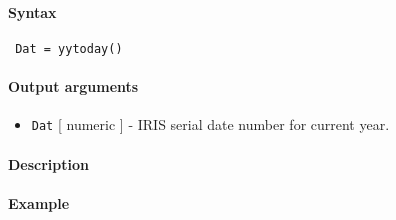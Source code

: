 


	\paragraph{Syntax}
 
 \begin{verbatim}
 Dat = yytoday()
 \end{verbatim}
 
 \paragraph{Output arguments}
 
 \begin{itemize}
 \item
   \texttt{Dat} {[} numeric {]} - IRIS serial date number for current
   year.
 \end{itemize}
 
 \paragraph{Description}
 
 \paragraph{Example}



